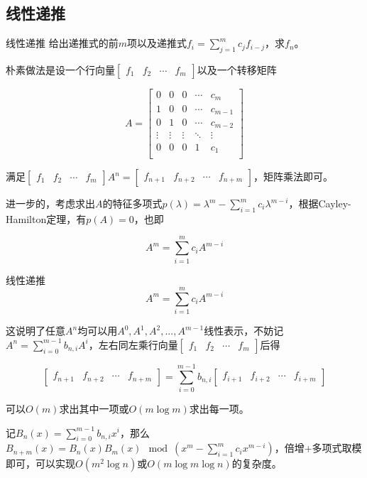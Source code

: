 \documentclass{beamer}
\begin{document}
	\subsection{线性递推}
	\begin{frame}{线性递推}
		给出递推式的前$m$项以及递推式$f_i=\sum_{j=1}^mc_jf_{i-j}$，求$f_n$。
		
		朴素做法是设一个行向量$\begin{bmatrix}f_1 & f_2 & \cdots & f_m\end{bmatrix}$以及一个转移矩阵
		
		$$A=\begin{bmatrix}
		0 & 0 & 0 & \cdots & c_m\\
		1 & 0 & 0 & \cdots & c_{m-1}\\
		0 & 1 & 0 & \cdots & c_{m-2}\\
		\vdots & \vdots  & \vdots & \ddots & \vdots \\
		0 & 0 & 0 & 1 & c_1\\
		\end{bmatrix}$$
		
		满足$\begin{bmatrix}f_1 & f_2 & \cdots & f_m\end{bmatrix} A^n = \begin{bmatrix}f_{n+1} & f_{n+2} & \cdots & f_{n+m}\end{bmatrix}$，矩阵乘法即可。
		
		进一步的，考虑求出$A$的特征多项式$p(\lambda)=\lambda^m-\sum_{i=1}^mc_i\lambda^{m-i}$，根据Cayley-Hamilton定理，有$p(A)=0$，也即
		
		$$A^m=\sum_{i=1}^mc_iA^{m-i}$$
		
	\end{frame}
	\begin{frame}{线性递推}
		$$A^m=\sum_{i=1}^mc_iA^{m-i}$$
		
		这说明了任意$A^n$均可以用$A^0,A^1,A^2,...,A^{m-1}$线性表示，不妨记$A^n=\sum_{i=0}^{m-1}b_{n,i}A^i$，左右同左乘行向量$\begin{bmatrix}f_1 & f_2 & \cdots & f_m\end{bmatrix}$后得
		
		$$\begin{bmatrix}f_{n+1} & f_{n+2} & \cdots & f_{n+m}\end{bmatrix}=\sum_{i=0}^{m-1}b_{n,i}\begin{bmatrix}f_{i+1} & f_{i+2} & \cdots & f_{i+m}\end{bmatrix}$$
		
		可以$O(m)$求出其中一项或$O(m\log m)$求出每一项。
		
		记$B_n(x)=\sum_{i=0}^{m-1}b_{n,i}x^i$，那么$B_{n+m}(x)=B_n(x)B_m(x) \mod (x^m-\sum_{i=1}^mc_ix^{m-i})$，倍增+多项式取模即可，可以实现$O(m^2\log n)$或$O(m\log m\log n)$的复杂度。
		
	\end{frame}
\end{document}
